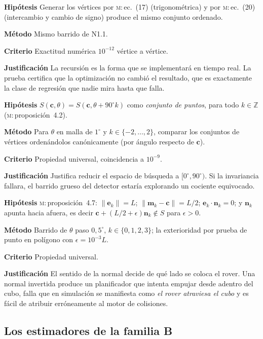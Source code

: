 \documentclass[11pt,a4paper]{article}
\newcommand{\nn}{\mathbf{n}}
\newcommand{\cc}{\mathbf{c}}
\newcommand{\ee}{\mathbf{e}}
\newcommand{\grados}{^{\circ}}
\newenvironment{prueba}[2]{%
  \par\medskip\noindent
  \begin{tcolorbox}[enhanced,breakable,colback=white,colframe=black!45,
    boxrule=0.5pt,arc=1pt,left=6pt,right=6pt,top=4pt,bottom=4pt,
    title={\bfseries #1\quad\normalfont #2},
    colbacktitle=black!8,coltitle=black,fonttitle=\bfseries\small]
  \small
}{\end{tcolorbox}\par\medskip}
\newcommand{\campo}[1]{\par\smallskip\noindent\textbf{#1}\quad\ignorespaces}
\begin{document}
\begin{prueba}{N1.2}{Equivalencia de la recursión de $90\grados$}
\campo{Hipótesis} Generar los vértices por \textsc{m}:\,ec.~(17) (trigonométrica) y por
\textsc{m}:\,ec.~(20) (intercambio y cambio de signo) produce el mismo conjunto ordenado.
\campo{Método} Mismo barrido de N1.1.
\campo{Criterio} Exactitud numérica $10^{-12}$ vértice a vértice.
\campo{Justificación} La recursión es la forma que se implementará en tiempo real. La
prueba certifica que la optimización no cambió el resultado, que es exactamente la
clase de regresión que nadie mira hasta que falla.
\end{prueba}

\begin{prueba}{N1.3}{Invariancia bajo el grupo $C_4$}
\campo{Hipótesis} $S(\cc,\theta) = S(\cc,\theta+90\grados k)$ como \emph{conjunto de
puntos}, para todo $k\in\mathbb Z$ (\textsc{m}:\,proposición~4.2).
\campo{Método} Para $\theta$ en malla de $1\grados$ y $k \in \{-2,\dots,2\}$, comparar
los conjuntos de vértices ordenándolos canónicamente (por ángulo respecto de $\cc$).
\campo{Criterio} Propiedad universal, coincidencia a $10^{-9}$.
\campo{Justificación} Justifica reducir el espacio de búsqueda a $[0\grados,90\grados)$.
Si la invariancia fallara, el barrido grueso del detector estaría explorando un
cociente equivocado.
\end{prueba}

\begin{prueba}{N1.4}{Aristas, puntos medios y normales exteriores}
\campo{Hipótesis} \textsc{m}:\,proposición~4.7: $\|\ee_k\| = L$;
$\|\mathbf m_k - \cc\| = L/2$; $\ee_k\cdot\nn_k = 0$; y $\nn_k$ apunta hacia afuera,
es decir $\cc + (L/2+\epsilon)\nn_k \notin S$ para $\epsilon>0$.
\campo{Método} Barrido de $\theta$ paso $0{,}5\grados$, $k\in\{0,1,2,3\}$; la
exterioridad por prueba de punto en polígono con $\epsilon = 10^{-3}L$.
\campo{Criterio} Propiedad universal.
\campo{Justificación} El sentido de la normal decide de qué lado se coloca el rover.
Una normal invertida produce un planificador que intenta empujar desde adentro del
cubo, falla que en simulación se manifiesta como \emph{el rover atraviesa el cubo} y
es fácil de atribuir erróneamente al motor de colisiones.
\end{prueba}

\subsection{Los estimadores de la familia B}
\end{document}
